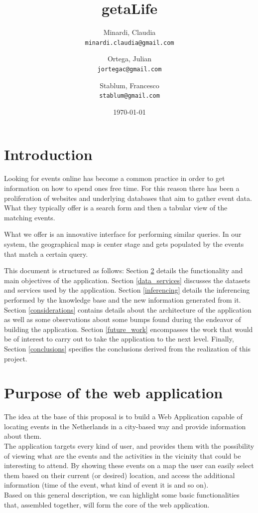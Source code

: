 \documentclass[hidelinks,a4paper]{article}
\title{getaLife}
\author{
  Minardi, Claudia\\
  \texttt{minardi.claudia@gmail.com}
  \and
  Ortega, Julian\\
  \texttt{jortegac@gmail.com}
  \and
  Stablum, Francesco\\
  \texttt{stablum@gmail.com}
}
\date{\today}
\begin{document}
\maketitle

\tableofcontents

\section{Introduction}

Looking for events online has become a common practice in order to get information
on how to spend ones free time. For this reason there has been a proliferation
of websites and underlying databases that aim to gather event data.
What they typically offer is a search form and then a tabular view of
the matching events.

What we offer is an innovative interface for performing similar queries.
In our system, the geographical map is center stage and gets populated by
the events that match a certain query.

This document is structured as follows: Section \ref{objective} details the functionality and main objectives of the application. Section \ref{data_services} discusses the datasets and services used by the application. Section \ref{inferencing} details the inferencing performed by the knowledge base and the new information generated from it. Section \ref{considerations} contains details about the architecture of the application as well as some observations about some bumps found during the endeavor of building the application. Section \ref{future_work} encompasses the work that would be of interest to carry out to take the application to the next level. Finally, Section \ref{conclusions} specifies the conclusions derived from the realization of this project.

\section{Purpose of the web application}\label{objective}
The idea at the base of this proposal is to build a Web Application capable of locating events in the Netherlands in a city-based way and provide information about them. \\
\indent The application targets every kind of user, and provides them with the possibility of viewing what are the events and the activities in the vicinity that could be interesting to attend. By showing these events on a map the user can easily select them based on their current (or desired) location, and access the additional information (time of the event, what kind of event it is and so on).\\
\indent Based on this general description, we can highlight some basic functionalities that, assembled together, will form the core of the web application.
\end{document}

